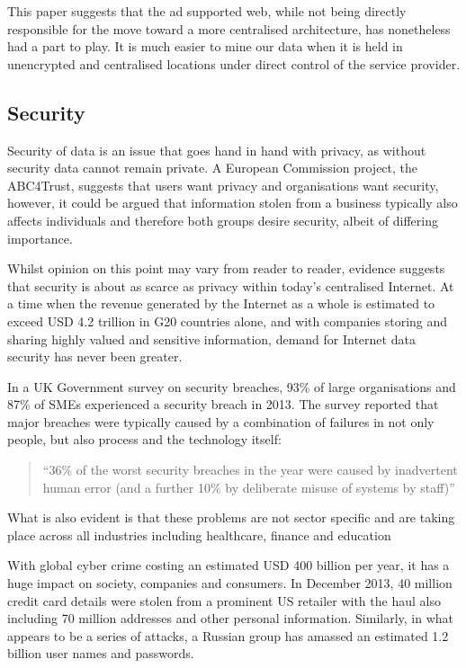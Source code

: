 \documentclass[twocolumn,english]{article}
\begin{document}
This paper suggests that the ad supported web, while not being directly
responsible for the move toward a more centralised architecture, has
nonetheless had a part to play. It is much easier to mine our data
when it is held in unencrypted and centralised locations under direct control of the service provider.

 

\subsection{Security}

Security of data is an issue that goes hand in hand with privacy,
as without security data cannot remain private. A European Commission
project, the ABC4Trust, suggests that users want privacy and organisations
want security, however, it could be argued that information stolen
from a business typically also affects individuals and therefore both
groups desire security, albeit of differing importance\cite{euABC4Trust}.

Whilst opinion on this point may vary from reader to reader, evidence
suggests that security is about as scarce as privacy within today\textquoteright s
centralised Internet. At a time when the revenue generated by the
Internet as a whole is estimated to exceed USD 4.2 trillion in G20 countries
alone, and with companies storing and sharing highly valued and sensitive
information, demand for Internet data security has never been greater\cite{bcg12}. %

In a UK Government survey on security breaches, 93\% of large organisations
and 87\% of SMEs experienced a security breach in
2013. The survey reported that major breaches were typically caused
by a combination of failures in not only people, but also process
and the technology itself\cite{ukgov13}:
\begin{quote}
\textquotedblleft 36\% of the worst security breaches in the year
were caused by inadvertent human error (and a further 10\% by deliberate
misuse of systems by staff)\textquotedblright{} 
\end{quote}
What is also evident is that these problems are not sector specific
and are taking place across all industries including healthcare, finance
and education\cite{symantec14}

With global cyber crime costing an estimated USD 400 billion per year,
it has a huge impact on society, companies and consumers\cite{mcafee14}. In December 2013, 40 million credit card details were stolen from
a prominent US retailer with the haul also including 70 million addresses
and other personal information. Similarly, in what appears to be a
series of attacks, a Russian group has amassed an estimated 1.2 billion
user names and passwords\cite{nyt14}.
\end{document}
